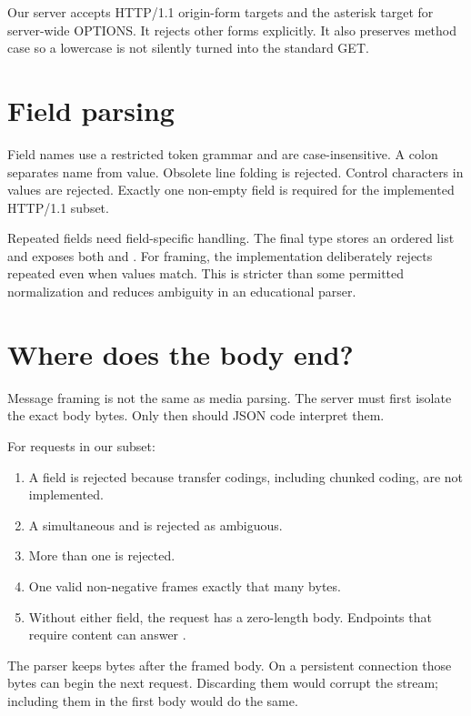 Our server accepts HTTP/1.1 origin-form targets and the asterisk target for
server-wide OPTIONS. It rejects other forms explicitly. It also preserves method
case so a lowercase  is not silently turned into the standard GET.

\section{Field parsing}

Field names use a restricted token grammar and are case-insensitive. A colon
separates name from value. Obsolete line folding is rejected. Control characters
in values are rejected. Exactly one non-empty  field is required for
the implemented HTTP/1.1 subset.

Repeated fields need field-specific handling. The final  type
stores an ordered list and exposes both  and . For
framing, the implementation deliberately rejects repeated 
even when values match. This is stricter than some permitted normalization and
reduces ambiguity in an educational parser.

\section{Where does the body end?}

Message framing is not the same as media parsing. The server must first isolate
the exact body bytes. Only then should JSON code interpret them.

For requests in our subset:

\begin{enumerate}
  \item A  field is rejected because transfer codings,
        including chunked coding, are not implemented.
  \item A simultaneous  and  is
        rejected as ambiguous.
  \item More than one  is rejected.
  \item One valid non-negative  frames exactly that many bytes.
  \item Without either field, the request has a zero-length body. Endpoints that
        require content can answer .
\end{enumerate}

The parser keeps bytes after the framed body. On a persistent connection those
bytes can begin the next request. Discarding them would corrupt the stream;
including them in the first body would do the same.

